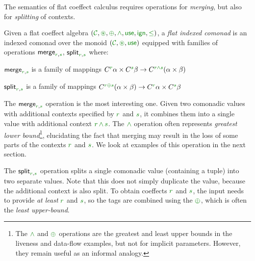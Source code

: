 The semantics of flat coeffect calculus requires operations for \emph{merging}, but also for
\emph{splitting} of contexts. 

\begin{definition}
Given a flat coeffect algebra $(\C, \cseq, \cpar, \czip, \cunit, \czero, \cleq)$,
a \emph{flat indexed comonad} is an indexed comonad over the monoid $(\C, \cseq, \cunit)$
equipped with families of operations $\ident{merge}_{\cclrd{r},\cclrd{s}}$, $\ident{split}_{\cclrd{r},\cclrd{s}}$ where:
%
\begin{compactitem}
\item $\ident{merge}_{\cclrd{r},\cclrd{s}}$ is a family of mappings
  $\ctyp{\cclrd{r}}{\alpha} \times \ctyp{\cclrd{s}}{\beta} \rightarrow \ctyp{\cclrd{r}\czip\cclrd{s}}{(\alpha \times \beta)}$
\item $\ident{split}_{\cclrd{r},\cclrd{s}}$ is a family of mappings
  $\ctyp{\cclrd{r}\cpar\cclrd{s}}{(\alpha \times \beta)} \rightarrow \ctyp{\cclrd{r}}{\alpha} \times \ctyp{\cclrd{s}}{\beta}$
\end{compactitem}
\end{definition}

\noindent
The $\ident{merge}_{\cclrd{r},\cclrd{s}}$ operation is the most interesting one. Given two comonadic
values with additional contexts specified by $\cclrd{r}$ and $\cclrd{s}$, it combines them into a 
single value with additional context $\cclrd{r}\,\czip\,\cclrd{s}$. The $\czip$ operation often represents
\emph{greatest lower bound}\footnote{The $\czip$ and $\cpar$ operations are the greatest and least upper 
bounds in the liveness and data-flow examples, but not for implicit parameters. However, they remain useful 
as an informal analogy.}, elucidating the fact that merging may result in the loss of some parts of 
the contexts $\cclrd{r}$ and $\cclrd{s}$. We look at examples of this operation in the next section.

The $\ident{split}_{\cclrd{r},\cclrd{s}}$ operation splits a single comonadic value (containing a tuple)
into two separate values. Note that this does not simply duplicate the value, because the additional
context is also split. To obtain coeffects $\cclrd{r}$ and $\cclrd{s}$, the input needs to provide 
\emph{at least} $\cclrd{r}$ and $\cclrd{s}$, so the tags are combined using the $\cpar$, which is often 
the \emph{least upper-bound}\footnotemark[1].

